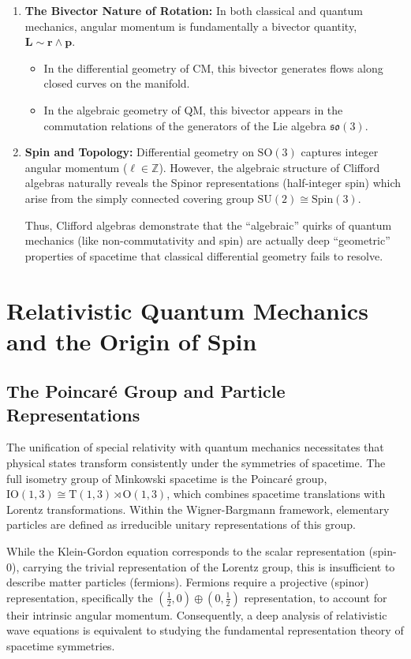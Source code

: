 \begin{enumerate}
	\item \textbf{The Bivector Nature of Rotation:}
		In both classical and quantum mechanics, angular momentum is fundamentally a
		bivector quantity, $\mathbf{L} \sim \mathbf{r} \wedge \mathbf{p}$.
		\begin{itemize}
			\item In the differential geometry of CM, this bivector generates flows
				along closed curves on the manifold.
			\item In the algebraic geometry of QM, this bivector appears in the
				commutation relations of the generators of the Lie algebra
				$\mathfrak{so}(3)$.
		\end{itemize}

	\item \textbf{Spin and Topology:}
		Differential geometry on $\mathrm{SO}(3)$ captures integer angular momentum ($\ell
		\in \mathbb{Z}$). However, the algebraic structure of Clifford algebras
		naturally reveals the Spinor representations (half-integer spin) which
		arise from the simply connected covering group $\mathrm{SU}(2) \cong \mathrm{Spin}(3)$.

		Thus, Clifford algebras demonstrate that the ``algebraic'' quirks of quantum
		mechanics (like non-commutativity and spin) are actually deep ``geometric''
		properties of spacetime that classical differential geometry fails to
		resolve.
\end{enumerate}

\section{Relativistic Quantum Mechanics and the Origin of Spin}

\subsection{The Poincaré Group and Particle Representations}
The unification of special relativity with quantum mechanics necessitates that
physical states transform consistently under the symmetries of spacetime.
The full isometry group of Minkowski spacetime is the Poincaré group,
$\mathrm{IO}(1, 3) \cong \mathrm{T}(1, 3) \rtimes \mathrm{O}(1, 3)$, which
combines spacetime translations with Lorentz transformations.
Within the Wigner-Bargmann framework, elementary particles are defined as
irreducible unitary representations of this group.

While the Klein-Gordon equation corresponds to the scalar representation
(spin-0), carrying the trivial representation of the Lorentz group, this is
insufficient to describe matter particles (fermions). Fermions require a
projective (spinor) representation, specifically the
$(\frac{1}{2},0)\oplus(0,\frac{1}{2})$ representation, to account for their
intrinsic angular momentum. Consequently, a deep analysis of relativistic wave
equations is equivalent to studying the fundamental representation theory of
spacetime symmetries.

